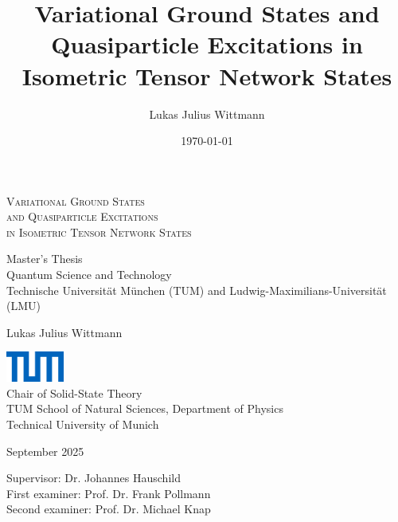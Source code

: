 \documentclass[12pt,a4paper]{book}
\title{Variational Ground States and Quasiparticle Excitations in Isometric Tensor Network States}
\author{Lukas Julius Wittmann}
\date{\today}
\begin{document}

\thispagestyle{empty}
\vspace{15mm}
\begin{center}
    \LARGE
    \textsc{Variational Ground States \\
    and Quasiparticle Excitations \\
    in Isometric Tensor Network States}
\end{center}
\vspace{4ex}
\begin{center}
    \Large
    Master's Thesis \\
    Quantum Science and Technology \\
    \normalsize
    \vspace{1.5ex}
    Technische Universität München (TUM) and Ludwig-Maximilians-Universität (LMU)
\end{center}
\vspace{4ex}
\begin{center} 
    \Large Lukas Julius Wittmann 
\end{center}
\vfill
\begin{center}
\end{center}
\vfill
\begin{center}
    \includegraphics[height=1cm]{title_page/tum_logo.png}
    \\[2ex]
    Chair of Solid-State Theory
    \\
    TUM School of Natural Sciences, Department of Physics
    \\
    Technical University of Munich
\end{center}
\newpage
\begin{center}
September 2025
\end{center}
\vfill
\begin{center}
Supervisor: Dr. Johannes Hauschild \\
First examiner: Prof. Dr. Frank Pollmann \\
Second examiner: Prof. Dr. Michael Knap
\end{center}
\restoregeometry
\end{document}
